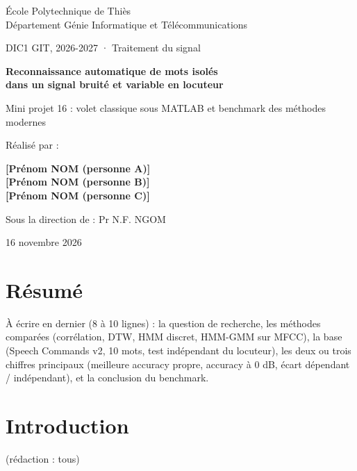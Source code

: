 \documentclass[11pt,a4paper]{article}
\newcommand{\ar}[1]{\colorbox{jaune}{\textbf{\small [#1]}}}            %
\newcommand{\redaction}[1]{\hfill{\small\color{gray}(rédaction : #1)}}   %
\begin{document}
\begin{titlepage}
\centering
{\large École Polytechnique de Thiès\\Département Génie Informatique et Télécommunications\par}
\vspace{1cm}
{\large DIC1 GIT, 2026-2027 · Traitement du signal\par}
\vspace{3cm}
{\LARGE\bfseries Reconnaissance automatique de mots isolés\\ dans un signal bruité et variable en locuteur\par}
\vspace{0.8cm}
{\large Mini projet 16 : volet classique sous MATLAB et benchmark des méthodes modernes\par}
\vspace{3cm}
{\large Réalisé par :\par}
\vspace{0.3cm}
\ar{Prénom NOM (personne A)}\\[0.3em]
\ar{Prénom NOM (personne B)}\\[0.3em]
\ar{Prénom NOM (personne C)}\par
\vspace{2cm}
{\large Sous la direction de : Pr N.F. NGOM\par}
\vfill
{\large 16 novembre 2026\par}
\end{titlepage}

\section*{Résumé}
\begin{aremplir}
À écrire en dernier (8 à 10 lignes) : la question de recherche, les méthodes comparées (corrélation, DTW, HMM discret, HMM-GMM sur MFCC), la base (Speech Commands v2, 10 mots, test indépendant du locuteur), les deux ou trois chiffres principaux (meilleure accuracy propre, accuracy à 0 dB, écart dépendant / indépendant), et la conclusion du benchmark.
\end{aremplir}

\tableofcontents
\newpage

\section{Introduction}\redaction{tous}
\end{document}
